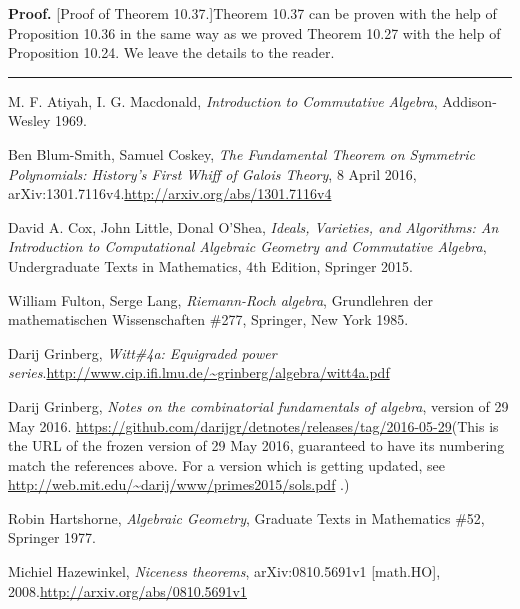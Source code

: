 \documentclass[numbers=enddot,12pt,final,onecolumn,notitlepage]{scrartcl}%
\newenvironment{proof}[1][Proof]{\noindent\textbf{#1.} }{\ \rule{0.5em}{0.5em}}
\begin{document}
\begin{proof}
[Proof of Theorem 10.37.]Theorem 10.37 can be proven with the help of
Proposition 10.36 in the same way as we proved Theorem 10.27 with the help of
Proposition 10.24. We leave the details to the reader.
\end{proof}

\begin{thebibliography}{999999999}                                                                                        %


M. F. Atiyah, I. G. Macdonald,
\textit{Introduction to Commutative Algebra}, Addison-Wesley 1969.

Ben Blum-Smith, Samuel Coskey, \textit{The
Fundamental Theorem on Symmetric Polynomials: History's First Whiff of Galois
Theory}, 8 April 2016, arXiv:1301.7116v4.\newline\url{http://arxiv.org/abs/1301.7116v4}

David A. Cox, John Little, Donal O'Shea,
\textit{Ideals, Varieties, and Algorithms: An Introduction to Computational
Algebraic Geometry and Commutative Algebra}, Undergraduate Texts in
Mathematics, 4th Edition, Springer 2015.

William Fulton, Serge Lang, \textit{Riemann-Roch
algebra}, Grundlehren der mathematischen Wissenschaften \#277, Springer, New
York 1985.

Darij Grinberg, \textit{Witt\#4a: Equigraded power
series}.\newline\url{http://www.cip.ifi.lmu.de/~grinberg/algebra/witt4a.pdf}

Darij Grinberg, \textit{Notes on the
combinatorial fundamentals of algebra}, version of 29 May 2016.\newline%
\url{https://github.com/darijgr/detnotes/releases/tag/2016-05-29}\newline(This
is the URL of the frozen version of 29 May 2016, guaranteed to have its
numbering match the references above. For a version which is getting updated,
see \url{http://web.mit.edu/~darij/www/primes2015/sols.pdf} .)

Robin Hartshorne, \textit{Algebraic Geometry},
Graduate Texts in Mathematics \#52, Springer 1977.

Michiel Hazewinkel, \textit{Niceness theorems},
arXiv:0810.5691v1 [math.HO], 2008.\newline\url{http://arxiv.org/abs/0810.5691v1}


\end{thebibliography}
\end{document}
